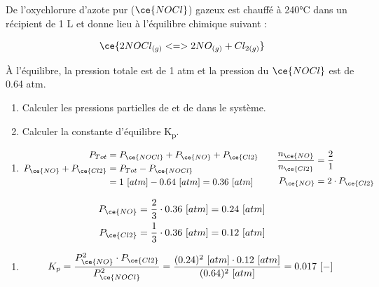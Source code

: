 \documentclass[
  11pt,
  a4paper,
  openany]{book}
\providecommand{\tightlist}{%
  \setlength{\itemsep}{0pt}\setlength{\parskip}{0pt}}
\begin{document}
\begin{Exercise}

De l'oxychlorure d'azote pur (\(\ce{NOCl}\)) gazeux est chauffé à 240°C dans un récipient de 1 L et donne lieu à l'équilibre chimique suivant :

\[
\ce{2 NOCl_{(g)} <=> 2 NO_{(g)} + Cl_{2(g)}}
\]

À l'équilibre, la pression totale est de 1 atm et la pression du \(\ce{NOCl}\) est de 0.64 atm.

\begin{enumerate}
\def\labelenumi{\alph{enumi}.}
\tightlist
\item
  Calculer les pressions partielles de  et de  dans le système.
\item
  Calculer la constante d'équilibre K\textsubscript{p}.
\end{enumerate}

\end{Exercise}

\begin{Answer}

\begin{enumerate}
\def\labelenumi{\alph{enumi}.}
\tightlist
\item
  \[
  \begin{split}
  P_{Tot} &= P_{\ce{NOCl}} + P_{\ce{NO}} + P_{\ce{Cl2}} \\
  P_{\ce{NO}} + P_{\ce{Cl2}} &= P_{Tot} - P_{\ce{NOCl}} \\
  &= 1\ [atm] - 0.64\ [atm] = 0.36\ [atm]
  \end{split}
  \qquad
  \begin{split}
  \frac{n_{\ce{NO}}}{n_{\ce{Cl2}}} &= \frac{2}{1} \\
  P_{\ce{NO}} &= 2 \cdot P_{\ce{Cl2}}
  \end{split}
  \]
\end{enumerate}

\[
\begin{split}
P_{\ce{NO}} &= \frac{2}{3} \cdot 0.36\ [atm] = 0.24\ [atm] \\
P_{\ce{Cl2}} &= \frac{1}{3} \cdot 0.36\ [atm] = 0.12\ [atm]
\end{split}
\]

\begin{enumerate}
\def\labelenumi{\alph{enumi}.}
\setcounter{enumi}{1}
\tightlist
\item
  \[
  \begin{split}
  K_{p} = \frac{P_{\ce{NO}}^2 \cdot P_{\ce{Cl2}} }{P_{\ce{NOCl}}^2} = \frac{(0.24)^2\ [atm] \cdot 0.12\ [atm]}{(0.64)^2\ [atm]} = 0.017\ [-]
  \end{split}
  \]
\end{enumerate}

\end{Answer}
\end{document}
